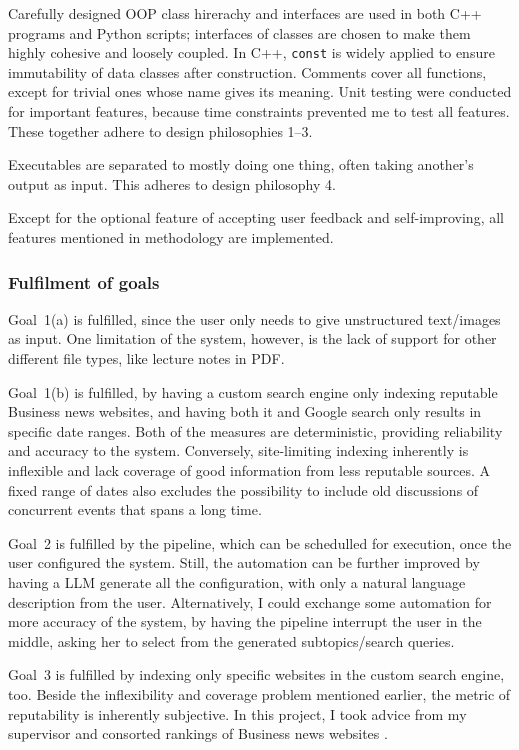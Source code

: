 \documentclass[final-report]{report-template}
\begin{document}
Carefully designed OOP class hirerachy and interfaces are used in both C++
programs and Python scripts; interfaces of classes are chosen to make them
highly cohesive and loosely coupled. In C++, \texttt{const} is widely applied
to ensure immutability of data classes after construction. Comments cover all
functions, except for trivial ones whose name gives its meaning. Unit testing
were conducted for important features, because time constraints prevented me
to test all features. These together adhere to design philosophies 1--3.

Executables are separated to mostly doing one thing, often taking another's
output as input. This adheres to design philosophy 4.

Except for the optional feature of accepting user feedback and self-improving,
all features mentioned in methodology are implemented. 

\subsubsection{Fulfilment of goals}
Goal~1(a) is fulfilled, since the user only needs to give unstructured
text/images as input. One limitation of the system, however, is the lack of
support for other different file types, like lecture notes in PDF.

Goal~1(b) is fulfilled, by having a custom search engine only indexing
reputable Business news websites, and having both it and Google search only
results in specific date ranges. Both of the measures are deterministic,
providing reliability and accuracy to the system. Conversely, site-limiting
indexing inherently is inflexible and lack coverage of good information from
less reputable sources. A fixed range of dates also excludes the possibility to
include old discussions of concurrent events that spans a long time.

Goal~2 is fulfilled by the pipeline, which can be schedulled for execution,
once the user configured the system. Still, the automation can be further
improved by having a LLM generate all the configuration, with only a natural
language description from the user. Alternatively, I could exchange some
automation for more accuracy of the system, by having the pipeline interrupt
the user in the middle, asking her to select from the generated
subtopics/search queries.

Goal~3 is fulfilled by indexing only specific websites in the custom search
engine, too. Beside the inflexibility and coverage problem mentioned earlier,
the metric of reputability is inherently subjective. In this project, I took
advice from my supervisor and consorted rankings of Business news
websites \cite{business.news.ranking.1, business.news.ranking.2}.
\end{document}
